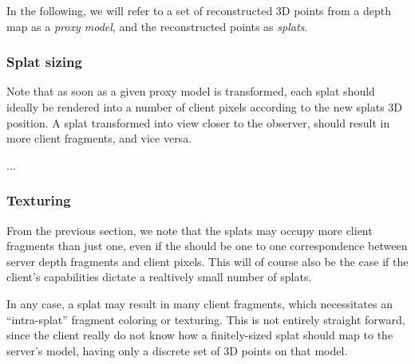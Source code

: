 In the following, we will refer to a set of reconstructed 3D points from a depth
map as a {\em proxy model}, and the reconstructed points as {\em splats}.

\subsubsection{Splat sizing}

Note that as soon as a given proxy model is transformed, each splat should
ideally be rendered into a number of client pixels according to the new splats
3D position. A splat transformed into view closer to the observer, should result
in more client fragments, and vice versa. 

...



\subsubsection{Texturing}

From the previous section, we note that the splats may occupy more client
fragments than just one, even if the should be one to one correspondence between
server depth fragments and client pixels. This will of course also be the case
if the client's capabilities dictate a realtively small number of splats.

In any case, a splat may result in many client fragments, which necessitates an
``intra-splat'' fragment coloring or texturing. This is not entirely straight
forward, since the client really do not know how a finitely-sized splat should
map to the server's model, having only a discrete set of 3D points on that
model.

\vspace{10cm}

